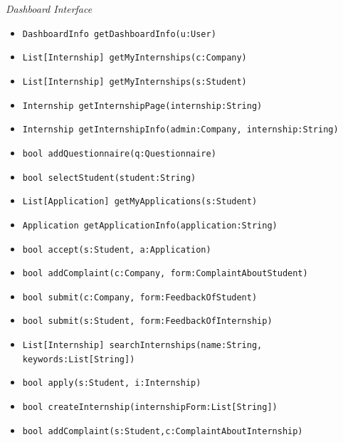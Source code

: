 \documentclass{article}
\begin{document}
\textit{Dashboard Interface}
\begin{itemize}
    \item \texttt{DashboardInfo getDashboardInfo(u:User)}
    \item \texttt{List[Internship] getMyInternships(c:Company)}
    \item \texttt{List[Internship] getMyInternships(s:Student)}
    \item \texttt{Internship getInternshipPage(internship:String)}
    \item \texttt{Internship getInternshipInfo(admin:Company, internship:String)}
    \item \texttt{bool addQuestionnaire(q:Questionnaire)}
    \item \texttt{bool selectStudent(student:String)}
    \item \texttt{List[Application] getMyApplications(s:Student)}
    \item \texttt{Application getApplicationInfo(application:String)}
    \item \texttt{bool accept(s:Student, a:Application)}
    \item \texttt{bool addComplaint(c:Company, form:ComplaintAboutStudent)}
    \item \texttt{bool submit(c:Company, form:FeedbackOfStudent)}
    \item \texttt{bool submit(s:Student, form:FeedbackOfInternship)}
    \item \texttt{List[Internship] searchInternships(name:String, keywords:List[String])}
    \item \texttt{bool apply(s:Student, i:Internship)}
    \item \texttt{bool createInternship(internshipForm:List[String])}
    \item \texttt{bool addComplaint(s:Student,c:ComplaintAboutInternship)}
\end{itemize}
\end{document}
